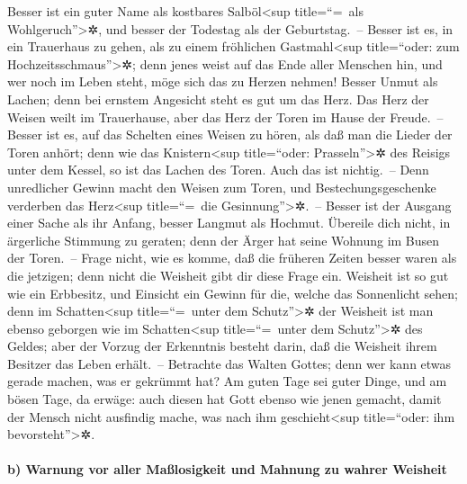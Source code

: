 Besser ist ein guter Name als kostbares
Salböl\textless sup title=``=~als Wohlgeruch''\textgreater✲, und besser
der Todestag als der Geburtstag.~-- Besser ist es, in ein
Trauerhaus zu gehen, als zu einem fröhlichen Gastmahl\textless sup
title=``oder: zum Hochzeitsschmaus''\textgreater✲; denn jenes weist auf
das Ende aller Menschen hin, und wer noch im Leben steht, möge sich das
zu Herzen nehmen! Besser Unmut als Lachen; denn bei
ernstem Angesicht steht es gut um das Herz. Das Herz der
Weisen weilt im Trauerhause, aber das Herz der Toren im Hause der
Freude.~-- Besser ist es, auf das Schelten eines Weisen zu
hören, als daß man die Lieder der Toren anhört; denn wie
das Knistern\textless sup title=``oder: Prasseln''\textgreater✲ des
Reisigs unter dem Kessel, so ist das Lachen des Toren. Auch das ist
nichtig.~-- Denn unredlicher Gewinn macht den Weisen zum
Toren, und Bestechungsgeschenke verderben das Herz\textless sup
title=``=~die Gesinnung''\textgreater✲.~-- Besser ist der
Ausgang einer Sache als ihr Anfang, besser Langmut als Hochmut.
Übereile dich nicht, in ärgerliche Stimmung zu geraten;
denn der Ärger hat seine Wohnung im Busen der Toren.~--
Frage nicht, wie es komme, daß die früheren Zeiten besser
waren als die jetzigen; denn nicht die Weisheit gibt dir diese Frage
ein. Weisheit ist so gut wie ein Erbbesitz, und Einsicht
ein Gewinn für die, welche das Sonnenlicht sehen; denn im
Schatten\textless sup title=``=~unter dem Schutz''\textgreater✲ der
Weisheit ist man ebenso geborgen wie im Schatten\textless sup
title=``=~unter dem Schutz''\textgreater✲ des Geldes; aber der Vorzug
der Erkenntnis besteht darin, daß die Weisheit ihrem Besitzer das Leben
erhält.~-- Betrachte das Walten Gottes; denn wer kann
etwas gerade machen, was er gekrümmt hat? Am guten Tage
sei guter Dinge, und am bösen Tage, da erwäge: auch diesen hat Gott
ebenso wie jenen gemacht, damit der Mensch nicht ausfindig mache, was
nach ihm geschieht\textless sup title=``oder: ihm
bevorsteht''\textgreater✲.

\hypertarget{b-warnung-vor-aller-mauxdflosigkeit-und-mahnung-zu-wahrer-weisheit}{%
\paragraph{b) Warnung vor aller Maßlosigkeit und Mahnung zu wahrer
Weisheit}\label{b-warnung-vor-aller-mauxdflosigkeit-und-mahnung-zu-wahrer-weisheit}}

